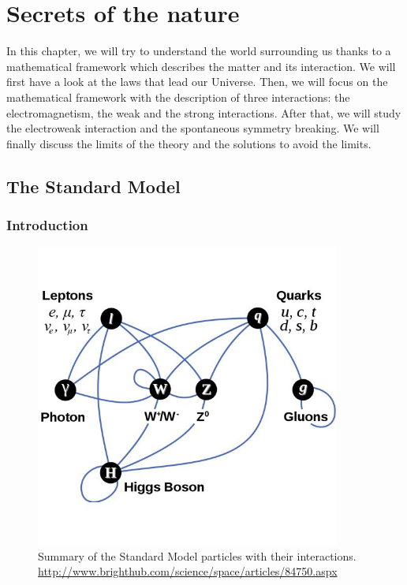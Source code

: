 \chapter{Secrets of the nature}
\label{chap:SM}


    In this chapter, we will try to understand the world surrounding us thanks to a mathematical framework which describes the matter and its interaction.
    We will first have a look at the laws that lead our Universe. Then, we will focus on the mathematical framework with the description of three interactions: the electromagnetism, the weak and the strong interactions.
    After that, we will study the electroweak interaction and the spontaneous symmetry breaking. We will finally discuss the limits of the theory and the solutions to avoid the limits. 
 \minitoc
 \clearpage
  \section{The Standard Model}

    \subsection{Introduction}
     
    \begin{figure}[!h]
    \centering
      \includegraphics[width = 10cm]{Pictures/SM/elementaryParticles.jpg}
    \caption{Summary of the Standard Model particles with their interactions.\\ \url{http://www.brighthub.com/science/space/articles/84750.aspx}}
    \label{fig:partInterac}
    \end{figure}   
    
